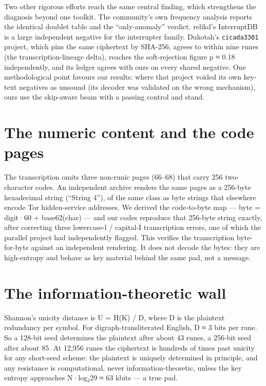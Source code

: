 \documentclass[11pt]{article}
\begin{document}
Two other rigorous efforts reach the same central finding, which strengthens the diagnosis beyond one toolkit. The community's own frequency analysis reports the identical doublet table and the ``only-anomaly'' verdict. relikd's InterruptDB is a large independent negative for the interrupter family. Dukotah's \texttt{cicada3301} project, which pins the same ciphertext by SHA-256, agrees to within nine runes (the transcription-lineage delta), reaches the soft-rejection figure p ≈ 0.18 independently, and its ledger agrees with ours on every shared negative. One methodological point favours our results: where that project voided its own key-text negatives as unsound (its decoder was validated on the wrong mechanism), ours use the skip-aware beam with a passing control and stand.

\section{The numeric content and the code pages}

The transcription omits three non-runic pages (66–68) that carry 256 two-character codes. An independent archive renders the same pages as a 256-byte hexadecimal string (``String 4''), of the same class as byte strings that elsewhere encode Tor hidden-service addresses. We derived the code-to-byte map --- byte = digit·60 + base62(char) --- and our codes reproduce that 256-byte string exactly, after correcting three lowercase-l / capital-I transcription errors, one of which the parallel project had independently flagged. This verifies the transcription byte-for-byte against an independent rendering. It does not decode the bytes: they are high-entropy and behave as key material behind the same pad, not a message.

\section{The information-theoretic wall}

Shannon's unicity distance \cite{shannon1949} is U = H(K) / D, where D is the plaintext redundancy per symbol. For digraph-transliterated English, D ≈ 3 bits per rune. So a 128-bit seed determines the plaintext after about 43 runes, a 256-bit seed after about 85. At 12,956 runes the ciphertext is hundreds of times past unicity for any short-seed scheme: the plaintext is uniquely determined in principle, and any resistance is computational, never information-theoretic, unless the key entropy approaches N·log₂29 ≈ 63 kbits --- a true pad.
\end{document}
